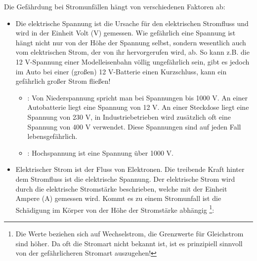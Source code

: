 \documentclass[ngerman,paper=a4,fontsize=8pt,headings=small,draft=no,parskip=half,noonelinecaption]{scrreprt}
\begin{document}
Die Gefährdung bei Stromunfällen
hängt von verschiedenen Faktoren ab:
\begin{itemize}
	\item {} Die elektrische Spannung
	ist die Ursache für den elektrischen Stromfluss und wird
	in der Einheit Volt (V) gemessen. Wie gefährlich eine Spannung ist hängt nicht nur von der Höhe der Spannung selbst, sondern wesentlich auch vom elektrischen Strom, der von ihr hervorgerufen wird, ab. So kann z.B. die 12 V-Spannung einer Modelleisenbahn völlig ungefährlich sein, gibt es jedoch im Auto bei einer (großen) 12 V-Batterie einen Kurzschluss, kann ein gefährlich großer Strom fließen!
		\begin{itemize}
		\item {}: Von Niederspannung spricht man bei Spannungen bis 1000 V. An einer Autobatterie liegt eine Spannung von 12 V. An einer Steckdose liegt eine Spannung von 230 V, in Industriebetrieben wird zusätzlich oft eine Spannung von 400 V verwendet. Diese Spannungen sind auf jeden Fall lebensgefährlich. 
		\item {}: Hochspannung ist eine Spannung über 1000 V. 
		\end{itemize}
	\item {} Elektrischer Strom ist der Fluss von Elektronen. Die treibende Kraft hinter dem Stromfluss ist die elektrische Spannung. Der elektrische Strom wird durch die elektrische Stromstärke beschrieben, welche mit der Einheit Ampere (A) gemessen wird. Kommt es zu einem Stromunfall ist die Schädigung im Körper von der Höhe der Stromstärke abhängig \footnote{Die Werte beziehen sich auf Wechselstrom, die Grenzwerte für Gleichstrom sind höher. Da oft die Stromart nicht bekannt ist, ist es prinzipiell sinnvoll von der gefährlicheren Stromart auszugehen!}:
\end{itemize}
\end{document}
